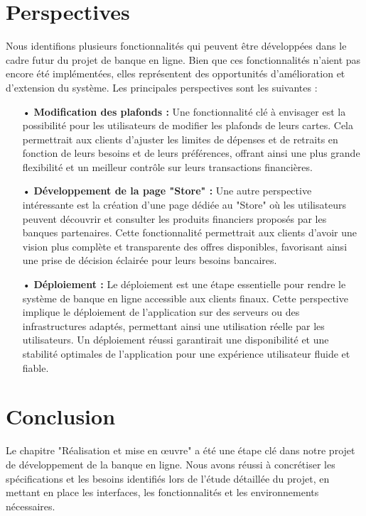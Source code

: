 \section{Perspectives}  
Nous identifions plusieurs fonctionnalités qui peuvent être développées dans le cadre futur du projet de banque en ligne. Bien que ces fonctionnalités n'aient pas encore été implémentées, elles représentent des opportunités d'amélioration et d'extension du système. Les principales perspectives sont les suivantes :

\begin{itemize}
    \item[•] \textbf{Modification des plafonds :}  Une fonctionnalité clé à envisager est la possibilité pour les utilisateurs de modifier les plafonds de leurs cartes. Cela permettrait aux clients d'ajuster les limites de dépenses et de retraits en fonction de leurs besoins et de leurs préférences, offrant ainsi une plus grande flexibilité et un meilleur contrôle sur leurs transactions financières.
    \item[•] \textbf{Développement de la page "Store" :} Une autre perspective intéressante est la création d'une page dédiée au "Store" où les utilisateurs peuvent découvrir et consulter les produits financiers proposés par les banques partenaires. Cette fonctionnalité permettrait aux clients d'avoir une vision plus complète et transparente des offres disponibles, favorisant ainsi une prise de décision éclairée pour leurs besoins bancaires.
    \item[•] \textbf{Déploiement :}  Le déploiement est une étape essentielle pour rendre le système de banque en ligne accessible aux clients finaux. Cette perspective implique le déploiement de l'application sur des serveurs ou des infrastructures adaptés, permettant ainsi une utilisation réelle par les utilisateurs. Un déploiement réussi garantirait une disponibilité et une stabilité optimales de l'application pour une expérience utilisateur fluide et fiable.
\end{itemize}

\section{Conclusion}
Le chapitre "Réalisation et mise en œuvre" a été une étape clé dans notre projet de développement de la banque en ligne. Nous avons réussi à concrétiser les spécifications et les besoins identifiés lors de l'étude détaillée du projet, en mettant en place les interfaces, les fonctionnalités et les environnements nécessaires.
